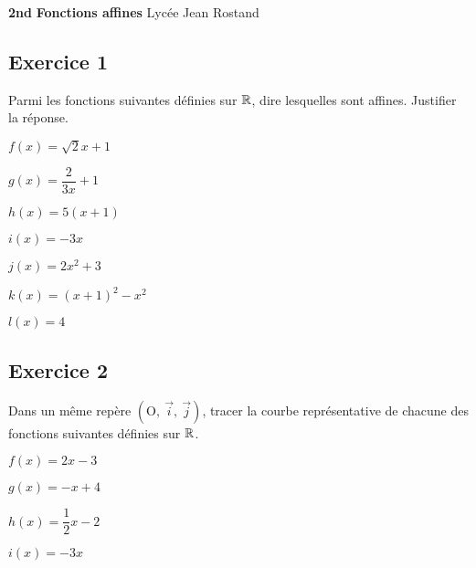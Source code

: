 \documentclass[12pt,a4paper]{article}
\def\Oij{$\left(\text{O},~\vec{i},~\vec{j}\right)$}
\begin{document}
\textbf{2nd} \hfill \textbf{Fonctions affines} \hfill Lycée Jean Rostand\\
\trait 

\subsection*{Exercice 1}

Parmi les fonctions suivantes définies sur $\mathbb{R}$, dire lesquelles sont affines. Justifier la réponse.

\begin{enumerate}
\begin{minipage}[t]{0.4\linewidth}
\item $f(x)=\sqrt{2}x+1$
\item $g(x)=\dfrac{2}{3x}+1$
\end{minipage}
\begin{minipage}[t]{0.4\linewidth}
\item $h(x)=5(x+1)$
\item $i(x)=-3x$
\end{minipage}
\begin{minipage}[t]{0.4\linewidth}
\item $j(x)=2x^2+3$
\item $k(x)=(x+1)^2-x^2$
\end{minipage}
\begin{minipage}[t]{0.4\linewidth}
\item $l(x)=4$

\end{minipage}
\end{enumerate}


\subsection*{Exercice 2}

Dans un même repère \Oij{}, tracer la courbe représentative de chacune des fonctions suivantes définies sur $\mathbb{R}$.


\begin{enumerate}
\begin{minipage}[c]{0.3\linewidth}
\item $f(x)=2x-3$
\end{minipage}
\begin{minipage}[c]{0.3\linewidth}
\item $g(x)=-x+4$
\end{minipage}
\begin{minipage}[c]{0.3\linewidth}
\item $h(x)=\dfrac{1}{2}x-2$
\end{minipage}
\begin{minipage}[c]{0.3\linewidth}
\item $i(x)=-3x$

\end{minipage}
\end{enumerate}
\end{document}
